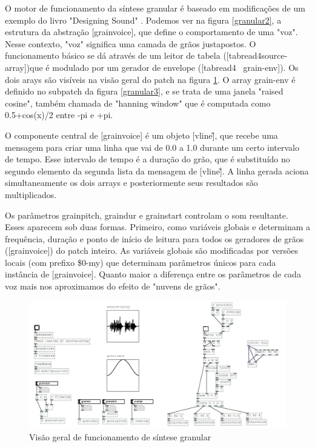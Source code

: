 \documentclass{ppgmus}
\begin{document}
O motor de funcionamento da síntese granular é baseado em modificações de um exemplo
do livro "Designing Sound" \cite{farnell2010designing}. Podemos ver na figura \ref{granular2}, a estrutura
da abstração [grainvoice], que define o comportamento de uma "voz". Nesse contexto,
"voz" significa uma camada de grãos justapostos. O funcionamento básico se dá através
de um leitor de tabela ([tabread4\texttildelow source-array])que é modulado por um gerador de envelope ([tabread4~ grain-env]).
Os dois arays são visíveis na visão geral do patch na figura \ref{granular-geral}. O array grain-env
é definido no subpatch da figura \ref{granular3}, e se trata de uma janela "raised cosine", também
chamada de "hanning window" que é computada como 0.5+cos(x)/2 entre -pi e +pi.

O componente central de [grainvoice] é um objeto [vline\~], que recebe uma mensagem para criar uma linha que 
vai de 0.0 a 1.0 durante um certo intervalo de tempo. Esse intervalo de tempo é a duração
do grão, que é substituído no segundo elemento da segunda lista da mensagem de [vline\~].
A linha gerada aciona simultaneamente os dois arrays e posteriormente 
seus resultados são multiplicados.

Os parâmetros grainpitch, graindur e grainstart controlam o som resultante. Esses aparecem sob duas
formas. Primeiro, como variáveis globais e determinam a frequência, duração e ponto de início de leitura para
todos os geradores de grãos ([grainvoice]) do patch inteiro. As variáveis globais são modificadas
por versões locais (com prefixo \$0-my) que determinam parâmetros únicos para cada instância de [grainvoice].
Quanto maior a diferença entre os parâmetros de cada voz mais nos aproximamos do efeito de "nuvens de grãos".

\begin{figure}
\includegraphics[scale=.6]{granular-geral}
\caption{Visão geral de funcionamento de síntese granular}
\label{granular-geral}
\end{figure}
\end{document}
